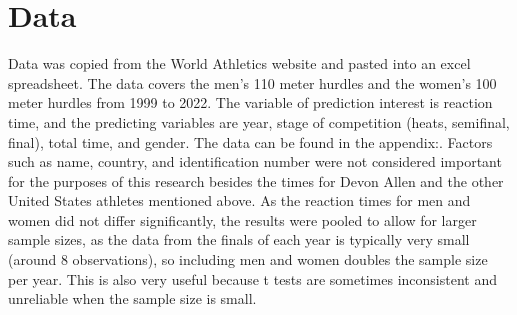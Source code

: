 \documentclass[12pt, letterpaper, titlepage]{article}
\begin{document}
\section{Data}
\label{sec:data}
Data was copied from the World Athletics website and pasted into an excel
spreadsheet. The data covers the men's 110 meter hurdles and the women's 100
meter hurdles from 1999 to 2022.  The variable of prediction interest is reaction
time, and the predicting variables are year, stage of competition (heats, 
semifinal, final), total time, and gender.  The data can be found in the appendix:.  
Factors such as name, country, and identification number were
not considered important for the purposes of this research besides the times for
Devon Allen and the other United States athletes mentioned above.  As the reaction
times for men and women did not differ significantly, the results were pooled
to allow for larger sample sizes, as the data from the finals of each year is
typically very small (around 8 observations), so including men and women doubles
the sample size per year.  This is also very useful because t tests are sometimes
inconsistent and unreliable when the sample size is small.
\end{document}
